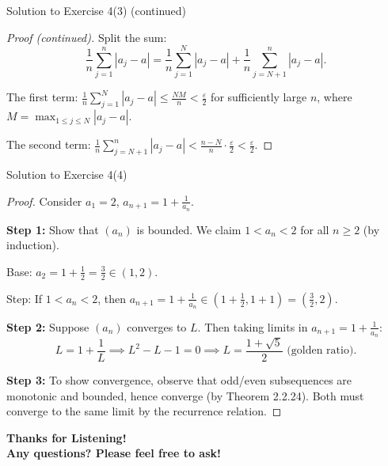 \documentclass[dvipsnames]{beamer}
\theoremstyle{plain}
\theoremstyle{definition}
\begin{document}
\begin{frame}{Solution to Exercise 4(3) (continued)}
  \begin{proof}[Proof (continued)]
Split the sum:
\[
\frac{1}{n}\sum_{j=1}^{n} |a_j - a| = \frac{1}{n}\sum_{j=1}^{N} |a_j - a| + \frac{1}{n}\sum_{j=N+1}^{n} |a_j - a|.
\]

The first term: \(\displaystyle \frac{1}{n}\sum_{j=1}^{N} |a_j - a| \le \frac{NM}{n} < \frac{\varepsilon}{2}\) for sufficiently large \(n\), where \(M = \max_{1 \le j \le N} |a_j - a|\).

The second term: \(\displaystyle \frac{1}{n}\sum_{j=N+1}^{n} |a_j - a| < \frac{n-N}{n} \cdot \frac{\varepsilon}{2} < \frac{\varepsilon}{2}\).
\end{proof}
\end{frame}

\begin{frame}{Solution to Exercise 4(4)}
\begin{proof}
Consider \(a_1 = 2\), \(a_{n+1} = 1 + \frac{1}{a_n}\).

\textbf{Step 1:} Show that \((a_n)\) is bounded. We claim \(1 < a_n < 2\) for all \(n \ge 2\) (by induction).

Base: \(a_2 = 1 + \frac{1}{2} = \frac{3}{2} \in (1, 2)\).

Step: If \(1 < a_n < 2\), then \(a_{n+1} = 1 + \frac{1}{a_n} \in (1 + \frac{1}{2}, 1 + 1) = (\frac{3}{2}, 2)\).

\vspace{0.2cm}

\textbf{Step 2:} Suppose \((a_n)\) converges to \(L\). Then taking limits in \(a_{n+1} = 1 + \frac{1}{a_n}\):
\[
L = 1 + \frac{1}{L} \implies L^2 - L - 1 = 0 \implies L = \frac{1 + \sqrt{5}}{2} \text{ (golden ratio)}.
\]

\vspace{0.2cm}

\textbf{Step 3:} To show convergence, observe that odd/even subsequences are monotonic and bounded, hence converge (by Theorem 2.2.24). Both must converge to the same limit by the recurrence relation.
\end{proof}
\end{frame}

\begin{frame}
    \begin{center}
    \huge \textbf{Thanks for Listening!} \\
    \vspace{0.5cm}
    \large \textbf{Any questions? Please feel free to ask!} \\
    \end{center}
\end{frame}
\end{document}
